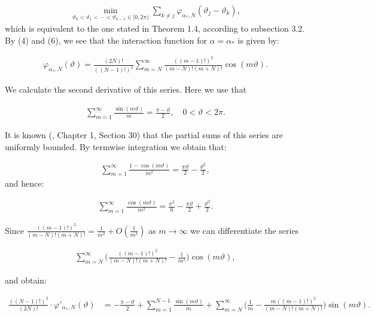 \documentclass{amsart}[11pt]
\newcommand{\vphi}{\varphi}
\newcommand{\vth}{\vartheta}
\newcommand{\ra}{\rightarrow}
\theoremstyle{definition}
\begin{document}
\begin{gather*}
    \min_{\vth_0 < \vth_1 < \cdots < \vth_{n-1} \in [0,2\pi)}\sum_{k \neq j}  \vphi_{\alpha_{\ast},N}(\vth_j - \vth_k),
\end{gather*}
which is equivalent to the one stated in Theorem 1.4, according to subsection 3.2. By (4) and (6), we see that the interaction function for $\alpha = \alpha_{\ast}$ is given by:

\begin{gather*}
    \vphi_{\alpha_{\ast},N}(\vth) = \frac{(2N)!}{((N-1)!)^2} \sum_{m=N}^{\infty} \frac{((m-1)!)^2}{(m-N)!(m+N)!} \cos(m \vth).
\end{gather*}

We calculate the second derivative of this series. Here we use that 

\begin{gather*}
\sum_{m = 1}^{\infty}\frac{\sin(m\vth)}{m} = \frac{\pi - \vth }{2} , \quad 0 < \vth < 2\pi.
\end{gather*}

It is known (\cite{Bary2014}, Chapter 1, Section 30) that the partial sums of this series are uniformly bounded. By termwise integration we obtain that:

\begin{gather*}
\sum_{m=1}^{\infty} \frac{1- \cos(m \vth)}{m^2} = \frac{\pi \vth}{2} - \frac{\vth^2}{2},
\end{gather*}
and hence:

\begin{gather*}
\sum_{m=1}^{\infty}\frac{\cos(m \vth)}{m^2} = \frac{\pi^2}{6} - \frac{\pi \vth}{2} + \frac{\vth^2}{2}.
\end{gather*}

Since $ \frac{((m-1)!)^2}{(m-N)!(m+N)!} = \frac{1}{m^2} + O(\frac{1}{m^3})$ as $ m \ra \infty$ we can differentiate the series 

\begin{gather*}
\sum_{m = N}^{\infty}\bigg( \frac{((m-1)!)^2}{(m-N)!(m+N)!} - \frac{1}{m^2} \bigg)\cos(m \vth),
\end{gather*}

and obtain:


\begin{align*}
\frac{((N-1)!)^2}{(2N)!} \cdot  \vphi'_{\alpha_{\ast},N}(\vth) 
&=- \frac{\pi - \vth}{2} + \sum_{m=1}^{N-1}\frac{\sin(m\vth)}{m} +   \sum_{m=N}^{\infty} \bigg( \frac{1}{m} - \frac{m((m-1)!)^2}{(m-N)!(m+N)!}\bigg) \sin(m\vth) .
\end{align*}
\end{document}
